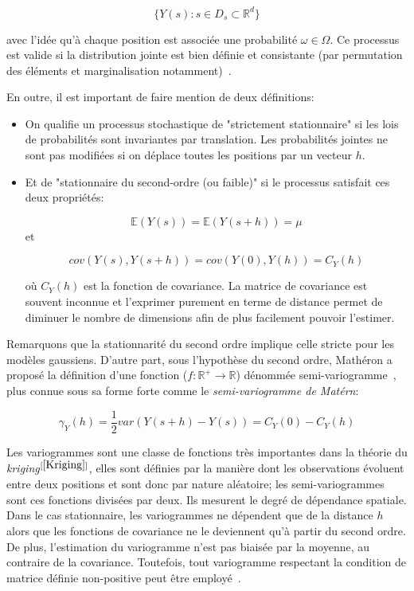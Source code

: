 \begin{equation}
    \{ Y(s) : s \in D_{s} \subset \mathbb{R}^{d} \}
\end{equation}

avec l'idée qu'à chaque position est associée une probabilité $\omega \in \Omega$. Ce processus est valide si la distribution jointe est bien définie et consistante (par permutation des éléments et marginalisation notamment)~\cite{kolmogorov1960strong}.

En outre, il est important de faire mention de deux définitions:
\begin{itemize}
    \item On qualifie un processus stochastique de "strictement stationnaire" si les lois de probabilités sont invariantes par translation. Les probabilités jointes ne sont pas modifiées si on déplace toutes les positions par un vecteur $h$.
    \item Et de "stationnaire du second-ordre (ou faible)" si le processus satisfait ces deux propriétés:
    
    \begin{equation}
        \mathbb{E}(Y(s)) = \mathbb{E}(Y(s + h)) = \mu
    \end{equation}
    et
    
    \begin{equation}
        cov(Y(s), Y(s + h)) = cov(Y(0), Y(h)) = C_{Y}(h)
    \end{equation}
    
    où $C_{Y}(h)$ est la fonction de covariance. La matrice de covariance est souvent inconnue et l'exprimer purement en terme de distance permet de diminuer le nombre de dimensions afin de plus facilement pouvoir l'estimer.
\end{itemize}

Remarquons que la stationnarité du second ordre implique celle stricte pour les modèles gaussiens. D'autre part, sous l'hypothèse du second ordre, Mathéron a proposé la définition d'une fonction ($f: \mathbb{R}^{+} \rightarrow \mathbb{R}$) dénommée semi-variogramme~\cite{matheron1971theory}, plus connue sous sa forme forte comme le \textit{semi-variogramme de Matérn}:

\begin{equation}
    \gamma_{Y}(h) = \frac{1}{2} var(Y(s + h) - Y(s)) = C_{Y}(0) - C_{Y}(h)
\end{equation}

Les variogrammes sont une classe de fonctions très importantes dans la théorie du \textit{kriging}$^{[\ref{Kriging}]}$, elles sont définies par la manière dont les observations évoluent entre deux positions et sont donc par nature aléatoire; les semi-variogrammes sont ces fonctions divisées par deux. Ils mesurent le degré de dépendance spatiale. Dans le cas stationnaire, les variogrammes ne dépendent que de la distance $h$ alors que les fonctions de covariance ne le deviennent qu'à partir du second ordre. De plus, l'estimation du variogramme n'est pas biaisée par la moyenne, au contraire de la covariance. Toutefois, tout variogramme respectant la condition de matrice définie non-positive peut être employé~\cite{ver1993multivariable}.

